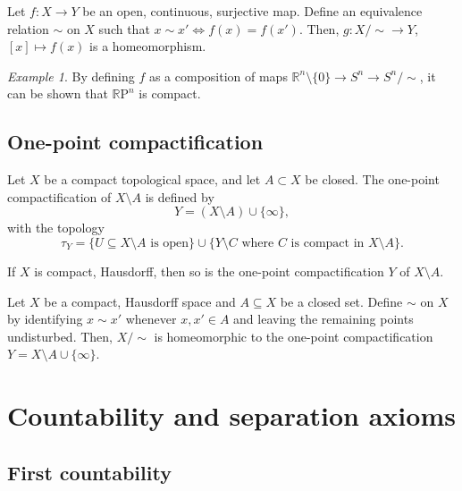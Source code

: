 \documentclass[11pt]{article}
\newcommand{\R}{\mathbb{R}}
\newcommand{\RP}{\R\mathrm{P}}
\theoremstyle{definition}
\theoremstyle{remark}
\newtheorem*{example}{Example}
\numberwithin{equation}{section}
\begin{document}
    \begin{lemma}
        Let $f\colon X \to Y$ be an open, continuous, surjective map. Define an
        equivalence relation $\sim$ on $X$ such that $x \sim x' \Leftrightarrow
        f(x) = f(x')$. Then, $g\colon X/\!\sim \to Y$, $[x] \mapsto f(x)$ is a
        homeomorphism.
    \end{lemma}
    \begin{example}
        By defining $f$ as a composition of maps $\R^n\setminus\{0\} \to S^n \to
        S^n/\!\sim$, it can be shown that $\RP^n$ is compact.
    \end{example}


    \subsection{One-point compactification}

    \begin{definition}
        Let $X$ be a compact topological space, and let $A \subset X$ be closed. The
        one-point compactification of $X\setminus A$ is defined by \[
            Y = (X \setminus A) \cup\{\infty\},
        \] with the topology \[
            \tau_Y = \{U\subseteq X\setminus A\text{ is open}\} \cup \{Y\setminus
            C\text{ where } C\text{ is compact in }X\setminus A\}.
        \] 
    \end{definition}

    \begin{lemma}
        If $X$ is compact, Hausdorff, then so is the one-point compactification $Y$
        of $X\setminus A$.
    \end{lemma}

    \begin{lemma}
        Let $X$ be a compact, Hausdorff space and $A\subseteq X$ be a closed set.
        Define $\sim$ on $X$ by identifying $x \sim x'$ whenever $x, x' \in A$ and
        leaving the remaining points undisturbed. Then, $X/\!\sim$ is homeomorphic to
        the one-point compactification $Y = X\setminus A \cup \{\infty\}$.
    \end{lemma}
    

    \section{Countability and separation axioms}
    
    \subsection{First countability}
    
\end{document}
